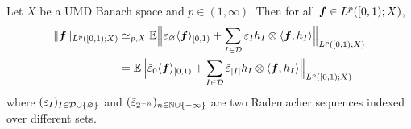 \begin{prop}\label{prop:haar-sqfn}
  Let $X$ be a UMD Banach space and $p \in (1,\infty)$.
  Then for all $\bm{f} \in L^p([0,1);X)$,
  \begin{equation*}
    \begin{aligned}
    \|\bm{f}\|_{L^p([0,1);X)}
    &\simeq_{p,X} \mathbb{E} \Big\| \varepsilon_{\varnothing} \langle \bm{f} \rangle_{[0,1)} +  \sum_{I \in \mathcal{D}} \varepsilon_{I} h_{I} \otimes \langle \bm{f}, h_{I} \rangle \Big\|_{L^p([0,1);X)} \\
    &= \mathbb{E} \Big\| \tilde{\varepsilon}_{0} \langle \bm{f} \rangle_{[0,1)} + \sum_{I \in \mathcal{D}} \tilde{\varepsilon}_{|I|} h_{I} \otimes \langle \bm{f}, h_{I} \rangle \Big\|_{L^p([0,1);X)}
  \end{aligned}
\end{equation*}
where $(\varepsilon_{I})_{I \in \mathcal{D} \cup \{\varnothing\}}$ and $(\tilde{\varepsilon}_{2^{-n}})_{n \in \mathbb{N} \cup \{-\infty\}}$ are two Rademacher sequences indexed over different sets.
\end{prop}

